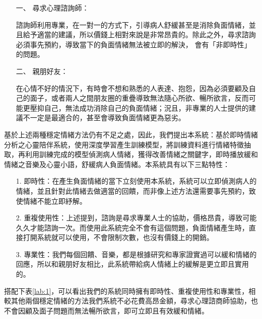 \documentclass[12pt]{scrreprt}
\begin{document}
\begin{itemize}
\item[一、]{尋求心理諮詢師：}

諮詢師利用專業，在一對一的方式下，引導病人舒緩甚至是消除負面情緒，並且給予適當的建議，所以價錢上相對來說是非常昂貴的。除此之外，尋求諮詢必須事先預約，導致當下的負面情緒無法被立即的解決， 會有「非即時性」的問題。

\item[二、]{親朋好友：}

在心情不好的情況下，有時會不想和熟悉的人表達、抱怨，因為必須要顧及自己的面子，或者兩人之間朋友圈的重疊導致無法隨心所欲、暢所欲言，反而可能更壓抑自己，無法成功消除自己的負面情緒；況且，非專業的人士提供的建議不一定是最適合的，甚至會導致負面情緒更為惡劣。

\end{itemize}

基於上述兩種穩定情緒方法仍有不足之處，因此，我們提出本系統：基於即時情緒分析之心靈陪伴系統，使用深度學習產生訓練模型，將訓練資料進行情緒特徵抽取，再利用訓練完成的模型偵測病人情緒，獲得改善情緒之關鍵字，即時播放緩和情緒之音樂及心靈小語，舒緩病人負面情緒。本系統具有以下三點特性：
\begin{itemize}
\item[1.]{ 即時性：}在產生負面情緒的當下立刻使用本系統，系統可以立即偵測病人的情緒，並且針對此情緒去做適當的回饋，而非像上述方法還需要事先預約，致使情緒不能立即紓解。

\item[2.]{重複使用性：}上述提到，諮詢是尋求專業人士的協助，價格昂貴，導致可能久久才能諮詢一次。而使用此系統完全不會有這個問題，負面情緒產生時，直接打開系統就可以使用，不會限制次數，也沒有價錢上的開銷。

\item[3.] {專業性：}我們每個回饋、音樂，都是根據研究和專家證實過可以緩和情緒的回應，所以和親朋好友相比，此系統帶給病人情緒上的緩解是更立即且實用的。
\end{itemize}

搭配下表\ref{lab:1}，可以看出我們的系統同時擁有即時性、重複使用性和專業性，相較其他兩個穩定情緒的方法我們系統不必花費高昂金額，尋求心理諮商師協助，也不會因顧及面子問題而無法暢所欲言，即可立即且有效緩和情緒。\\

\renewcommand{\arraystretch}{1.3} %
\begin{table}[!h]    
\centering
     \caption{各類穩定情緒方法之比較}
\label{lab:1}
\end{table}
\end{document}
